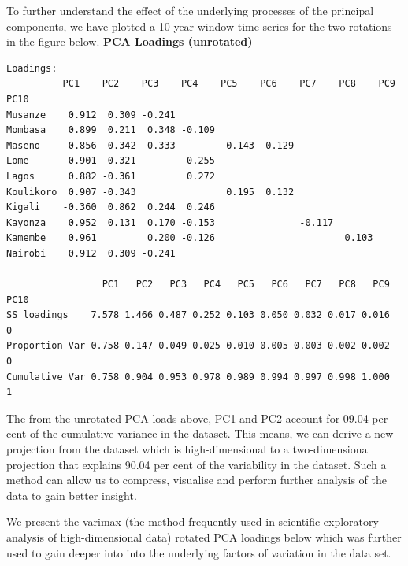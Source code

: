 \documentclass[12pt,a4paper]{article}
\begin{document}
To further understand the effect of the underlying processes of the principal components, we have plotted a 10 year window time series for the two rotations in the figure below.
\textbf{PCA Loadings (unrotated)}
\begin{verbatim}
Loadings:
          PC1    PC2    PC3    PC4    PC5    PC6    PC7    PC8    PC9    PC10  
Musanze    0.912  0.309 -0.241                                                 
Mombasa    0.899  0.211  0.348 -0.109                                          
Maseno     0.856  0.342 -0.333         0.143 -0.129                            
Lome       0.901 -0.321         0.255                                          
Lagos      0.882 -0.361         0.272                                          
Koulikoro  0.907 -0.343                0.195  0.132                            
Kigali    -0.360  0.862  0.244  0.246                                          
Kayonza    0.952  0.131  0.170 -0.153               -0.117                     
Kamembe    0.961         0.200 -0.126                       0.103              
Nairobi    0.912  0.309 -0.241                                                 

                 PC1   PC2   PC3   PC4   PC5   PC6   PC7   PC8   PC9 PC10
SS loadings    7.578 1.466 0.487 0.252 0.103 0.050 0.032 0.017 0.016    0
Proportion Var 0.758 0.147 0.049 0.025 0.010 0.005 0.003 0.002 0.002    0
Cumulative Var 0.758 0.904 0.953 0.978 0.989 0.994 0.997 0.998 1.000    1
\end{verbatim}

The from the unrotated PCA loads above, PC1 and PC2  account for 09.04 per cent of the cumulative variance in the dataset. This means, we can derive a new projection from the dataset which is high-dimensional to a two-dimensional projection that explains 90.04 per cent of the variability in the dataset. Such a method can allow us to compress, visualise and perform further analysis of the data to gain better insight.

We present the varimax (the method frequently used in scientific exploratory analysis of high-dimensional data) rotated PCA loadings below which was further used to gain deeper into into the underlying factors of variation in the data set.
\end{document}

